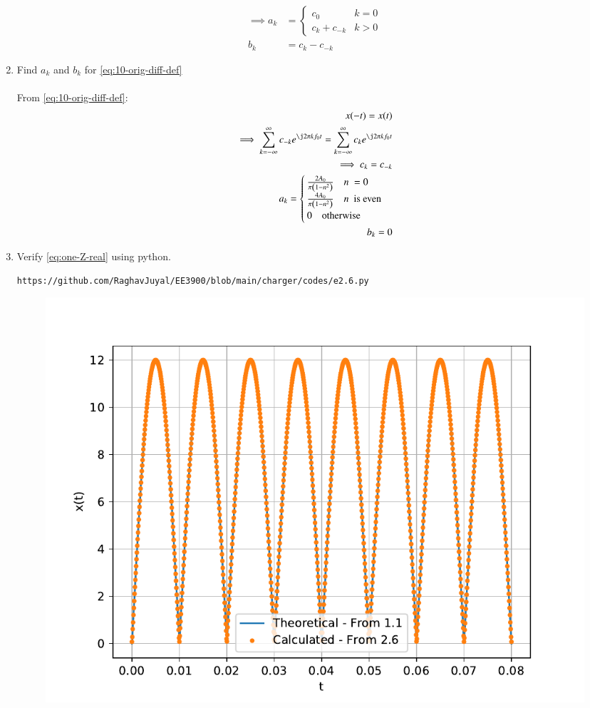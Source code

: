\documentclass[journal,12pt,twocolumn]{IEEEtran}
\renewcommand\thesection{\arabic{section}}
\begin{document}
\begin{enumerate}[label=\thesection.\arabic*,ref=\thesection.\theenumi]
\begin{align}
	\implies
	a_k &= 
	\begin{cases}
		c_0 & k = 0 \\
		c_k + c_{-k} & k > 0
	\end{cases} \label{eq:ak} \\
	b_k &= c_k - c_{-k}
	\label{eq:bk}
\end{align}
\item Find $a_k$ and $b_k$ for 
\eqref{eq:10-orig-diff-def}\\
\solution\\
From \eqref{eq:10-orig-diff-def}:
\begin{align}
	x(-t) = x(t)\\
	\implies \sum_{k = -\infty}^{\infty}c_{-k}e^{\j2\pi kf_0t}
	= \sum_{k = -\infty}^{\infty}c_ke^{\j2\pi kf_0 t}\\
	\implies c_k = c_{-k}\\
	a_k = \begin{cases}
		\frac{2A_0}{\pi\brak{1-n^2}} \quad n\ = 0\\
		\frac{4A_0}{\pi\brak{1-n^2}} \quad n\ \text{ is even}\\
		0 \quad \text{otherwise}
	\end{cases}\\
	b_k = 0
\end{align}
\item Verify 
\eqref{eq:one-Z-real}
using python.
\begin{lstlisting}
https://github.com/RaghavJuyal/EE3900/blob/main/charger/codes/e2.6.py
\end{lstlisting}
\begin{figure}[!ht]
	\begin{center}
		\includegraphics[width=\columnwidth]{./figs/e2.6.pdf}
	\end{center}
	\label{fig:ft}	
\end{figure}
\end{enumerate}
\end{document}
